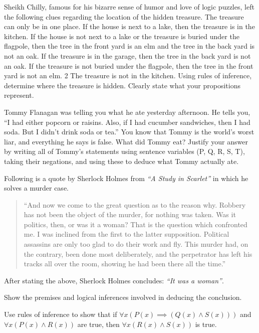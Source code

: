 \documentclass[a4paper]{exam}
\begin{document}
\begin{questions}
  \question Sheikh Chilly, famous for his bizarre sense of humor and love of logic puzzles, left the following clues regarding the location of the hidden treasure. The treasure can only be in one place. If the house is next to a lake, then the treasure is in the kitchen. If the house is not next to a lake or the treasure is buried under the flagpole, then the tree in the front yard is an elm and the tree in the back yard is not an oak. If the treasure is in the garage, then the tree in the back yard is not an oak.  If the treasure is not buried under the flagpole, then the tree in the front yard is not an elm. 2 The treasure is not in the kitchen. Using rules of inference, determine where the treasure is hidden. Clearly state what your propositions represent.
  \begin{solution}
  \end{solution}
  
  \question Tommy Flanagan was telling you what he ate yesterday afternoon. He tells you, “I had either popcorn or raisins. Also, if I had cucumber sandwiches, then I had soda. But I didn't drink soda or tea.” You know that Tommy is the world’s worst liar, and everything he says is false. What did Tommy eat?
Justify your answer by writing all of Tommy's statements using sentence variables (P, Q, R, S, T), taking their negations, and using these to deduce what Tommy actually ate.

  \begin{solution}
  \end{solution}

  \question Following is a quote by Sherlock Holmes from \textit{“A Study in Scarlet”} in which he solves a murder case.
\begin{quote}
``And now we come to the great question as to the reason why. Robbery has not been the object of the murder, for nothing was taken. Was it politics, then, or was it a woman? That is the question which confronted me. I was inclined from the first to the latter supposition. Political assassins are only too glad to do their work and fly. This murder had, on the contrary, been done most deliberately, and the perpetrator has left his tracks all over the room, showing he had been there all the time.''
\end{quote}
After stating the above, Sherlock Holmes concludes: \textit{``It was a woman''}.

Show the premises and logical inferences involved in deducing the conclusion.

  \begin{solution}
  \end{solution}
  
  \question Use rules of inference to show that if $\forall x(P(x) \implies (Q(x) \land S(x)))$ and $\forall x(P(x) \land R(x))$ are true, then $\forall x(R(x) \land S(x))$ is true.
  \begin{solution}
    \end{solution}

\end{questions}
\end{document}
